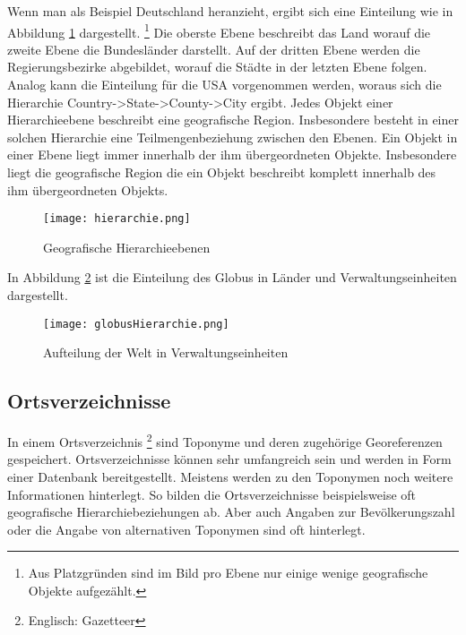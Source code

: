 			Wenn man als Beispiel Deutschland heranzieht, ergibt sich eine Einteilung wie in Abbildung \ref{img:hierarchy} dargestellt. \footnote{Aus Platzgründen sind im Bild pro Ebene nur einige wenige geografische Objekte aufgezählt.} 
			Die oberste Ebene beschreibt das Land worauf die zweite Ebene die Bundesländer darstellt.
			Auf der dritten Ebene werden die Regierungsbezirke abgebildet, worauf die Städte in der letzten Ebene folgen. 
			Analog kann die Einteilung für die USA vorgenommen werden, woraus sich die Hierarchie Country->State->County->City ergibt.
			Jedes Objekt einer Hierarchieebene beschreibt eine geografische Region. 
			Insbesondere besteht in einer solchen Hierarchie eine Teilmengenbeziehung zwischen den Ebenen. 
			Ein Objekt in einer Ebene liegt immer innerhalb der ihm übergeordneten Objekte.
			Insbesondere liegt die geografische Region die ein Objekt beschreibt komplett innerhalb des ihm übergeordneten Objekts.			

			\begin{figure}[h!]
			\begin{center}
			\texttt{[image: hierarchie.png]}
			\caption{Geografische Hierarchieebenen}
			\label{img:hierarchy}
			\end{center}
			\end{figure}	

			In Abbildung \ref{img:globusHierarchie} ist die Einteilung des Globus in Länder und Verwaltungseinheiten dargestellt. 

			\begin{figure}[h!]
			\begin{center}
			\texttt{[image: globusHierarchie.png]}
			\caption{Aufteilung der Welt in Verwaltungseinheiten}
			\label{img:globusHierarchie}
			\end{center}
			\end{figure}	

		\subsection{Ortsverzeichnisse}

			In einem Ortsverzeichnis \footnote{Englisch: Gazetteer} sind Toponyme und deren zugehörige Georeferenzen gespeichert.
			Ortsverzeichnisse können sehr umfangreich sein und werden in Form einer Datenbank bereitgestellt.
			Meistens werden zu den Toponymen noch weitere Informationen hinterlegt.
			So bilden die Ortsverzeichnisse beispielsweise oft geografische Hierarchiebeziehungen ab.
			Aber auch Angaben zur Bevölkerungszahl oder die Angabe von alternativen Toponymen sind oft hinterlegt.

